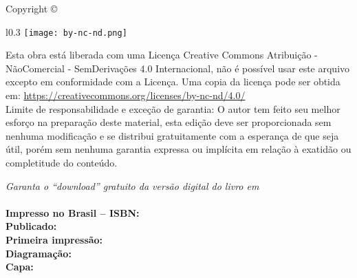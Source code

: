 
\newpage
\thispagestyle{empty}

\noindent Copyright \copyright\ \imprimiryear\ \myauthor\\ %

\begin{wrapfigure}{l}{0.3\textwidth}
\texttt{[image: by-nc-nd.png]}
\end{wrapfigure}
\noindent Esta obra está liberada com uma Licença 
Creative Commons Atribuição - NãoComercial - SemDerivações 4.0 Internacional,
não é possível usar este arquivo excepto em conformidade com a Licença. 
Uma copia da licença pode ser obtida em:
\url{https://creativecommons.org/licenses/by-nc-nd/4.0/}\\ %


\noindent Limite de responsabilidade e exceção de garantia: O autor tem feito
seu melhor esforço na preparação deste material,
esta edição deve ser proporcionada sem nenhuma modificação e
se distribui gratuitamente com a esperança de que seja útil, 
porém sem nenhuma garantia expressa ou implícita em relação à exatidão ou completitude do conteúdo.

\noindent \textit{Garanta o ``download'' gratuito da versão digital do livro em \ImprimirLinkHomePageLivro}\\

~\\

\noindent \textbf{Impresso no Brasil -- ISBN:} \imprimirisbn\\ %
\noindent \textbf{Publicado:} \imprimireditora\\ %
\noindent \textbf{Primeira impressão:}  \imprimirdata\\ %
\noindent \textbf{Diagramação:} \myauthor\\ %
\noindent \textbf{Capa:} \myauthor\\ %
~\\

\vfill

